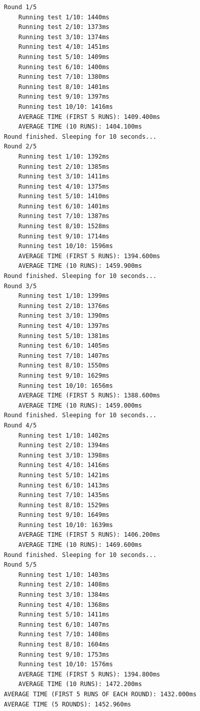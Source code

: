 \footnotesize\begin{verbatim}
    Round 1/5
        Running test 1/10: 1440ms
        Running test 2/10: 1373ms
        Running test 3/10: 1374ms
        Running test 4/10: 1451ms
        Running test 5/10: 1409ms
        Running test 6/10: 1400ms
        Running test 7/10: 1380ms
        Running test 8/10: 1401ms
        Running test 9/10: 1397ms
        Running test 10/10: 1416ms
        AVERAGE TIME (FIRST 5 RUNS): 1409.400ms
        AVERAGE TIME (10 RUNS): 1404.100ms
    Round finished. Sleeping for 10 seconds...
    Round 2/5
        Running test 1/10: 1392ms
        Running test 2/10: 1385ms
        Running test 3/10: 1411ms
        Running test 4/10: 1375ms
        Running test 5/10: 1410ms
        Running test 6/10: 1401ms
        Running test 7/10: 1387ms
        Running test 8/10: 1528ms
        Running test 9/10: 1714ms
        Running test 10/10: 1596ms
        AVERAGE TIME (FIRST 5 RUNS): 1394.600ms
        AVERAGE TIME (10 RUNS): 1459.900ms
    Round finished. Sleeping for 10 seconds...
    Round 3/5
        Running test 1/10: 1399ms
        Running test 2/10: 1376ms
        Running test 3/10: 1390ms
        Running test 4/10: 1397ms
        Running test 5/10: 1381ms
        Running test 6/10: 1405ms
        Running test 7/10: 1407ms
        Running test 8/10: 1550ms
        Running test 9/10: 1629ms
        Running test 10/10: 1656ms
        AVERAGE TIME (FIRST 5 RUNS): 1388.600ms
        AVERAGE TIME (10 RUNS): 1459.000ms
    Round finished. Sleeping for 10 seconds...
    Round 4/5
        Running test 1/10: 1402ms
        Running test 2/10: 1394ms
        Running test 3/10: 1398ms
        Running test 4/10: 1416ms
        Running test 5/10: 1421ms
        Running test 6/10: 1413ms
        Running test 7/10: 1435ms
        Running test 8/10: 1529ms
        Running test 9/10: 1649ms
        Running test 10/10: 1639ms
        AVERAGE TIME (FIRST 5 RUNS): 1406.200ms
        AVERAGE TIME (10 RUNS): 1469.600ms
    Round finished. Sleeping for 10 seconds...
    Round 5/5
        Running test 1/10: 1403ms
        Running test 2/10: 1408ms
        Running test 3/10: 1384ms
        Running test 4/10: 1368ms
        Running test 5/10: 1411ms
        Running test 6/10: 1407ms
        Running test 7/10: 1408ms
        Running test 8/10: 1604ms
        Running test 9/10: 1753ms
        Running test 10/10: 1576ms
        AVERAGE TIME (FIRST 5 RUNS): 1394.800ms
        AVERAGE TIME (10 RUNS): 1472.200ms
    AVERAGE TIME (FIRST 5 RUNS OF EACH ROUND): 1432.000ms
    AVERAGE TIME (5 ROUNDS): 1452.960ms
\end{verbatim}
\normalsize


